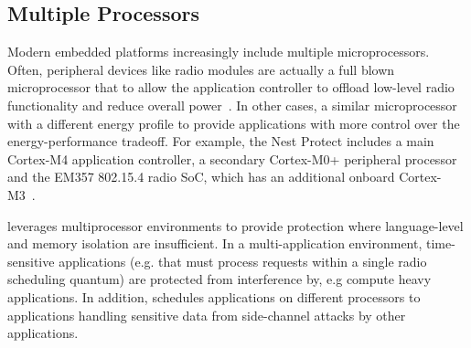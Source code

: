 \subsection{Multiple Processors}

Modern embedded platforms increasingly include multiple microprocessors. Often,
peripheral devices like radio modules are actually a full blown microprocessor
that to allow the application controller to offload low-level radio
functionality and reduce overall power~\cite{nrf51822,cc2540}. In other cases, a
similar microprocessor with a different energy profile to provide applications
with more control over the energy-performance tradeoff.  For example, the Nest
Protect includes a main Cortex-M4 application controller, a secondary Cortex-M0+
peripheral processor and the EM357 802.15.4 radio SoC, which has an additional
onboard Cortex-M3~\cite{nestprotect-teardown}.

\name leverages multiprocessor environments to provide protection where
language-level and memory isolation are insufficient. In a multi-application
environment, time-sensitive applications (e.g. that must process requests
within a single radio scheduling quantum) are protected from interference by,
e.g compute heavy applications. In addition, \name schedules applications on
different processors to applications handling sensitive data from side-channel
attacks by other applications.

